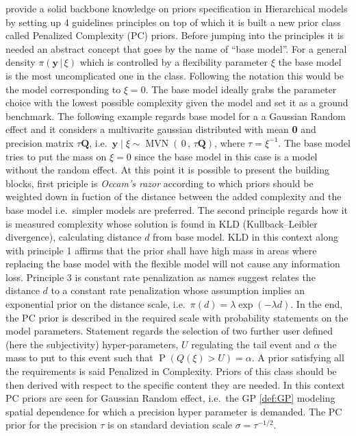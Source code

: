 \documentclass[
  12pt,
  a4paper,
  oneside]{book}
\theoremstyle{definition}
\theoremstyle{definition}
\theoremstyle{definition}
\theoremstyle{remark}
\begin{document}
\citet{simpson2017} provide a solid backbone knowledge on priors specification in Hierarchical models by setting up 4 guidelines principles on top of which it is built a new prior class called Penalized Complexity (PC) priors. Before jumping into the principles it is needed an abstract concept that goes by the name of ``base model''. For a general density \(\pi(\mathbf{y} \,| \,\xi)\) which is controlled by a flexibility parameter \(\xi\) the base model is the most uncomplicated one in the class. Following the notation this would be the model corresponding to \(\xi = 0\). The base model ideally grabs the parameter choice with the lowest possible complexity given the model and set it as a ground benchmark. The following example regards base model for a a Gaussian Random effect and it considers a multivarite gaussian distributed with mean \textbf{0} and precision matrix \(\tau \boldsymbol{Q}\), i.e.~\(\mathbf{y} \mid \xi \sim \operatorname{MVN}(\, 0\, ,\,\tau \boldsymbol{Q})\), where \(\tau=\xi^{-1}\). The base model tries to put the mass \citeyearpar{simpson2017} on \(\xi = 0\) since the base model in this case is a model without the random effect. At this point it is possible to present the building blocks, first priciple is \emph{Occam's razor} according to which priors should be weighted down in fuction of the distance between the added complexity and the base model i.e.~simpler models are preferred. The second principle regards how it is measured complexity whose solution is found in KLD (Kullback--Leibler divergence), calculating distance \(d\) from base model. KLD in this context along with principle 1 affirms that the prior shall have high mass in areas where replacing the base model with the flexible model will not cause any information loss. Principle 3 is constant rate penalization as names suggest relates the distance \(d\) to a constant rate penalization whose assumption implies an exponential prior on the distance scale, i.e.~\(\pi(d) = \lambda \exp (-\lambda d)\). In the end, the PC prior is described in the required scale with probability statements on the model parameters. Statement regards the selection of two further user defined (here the subjectivity) hyper-parameters, \(U\) regulating the tail event and \(\alpha\) the mass to put to this event such that \(\operatorname{P}(Q(\xi)>U)=\alpha\). A prior satisfying all the requirements is said Penalized in Complexity.
Priors of this class should be then derived with respect to the specific content they are needed. In this context PC priors are seen for Gaussian Random effect, i.e.~the GP \ref{def:GP} modeling spatial dependence for which a precision hyper parameter is demanded. The PC prior for the precision \(\tau\) is on standard deviation scale \(\sigma=\tau^{-1 / 2}\).\\
\end{document}
